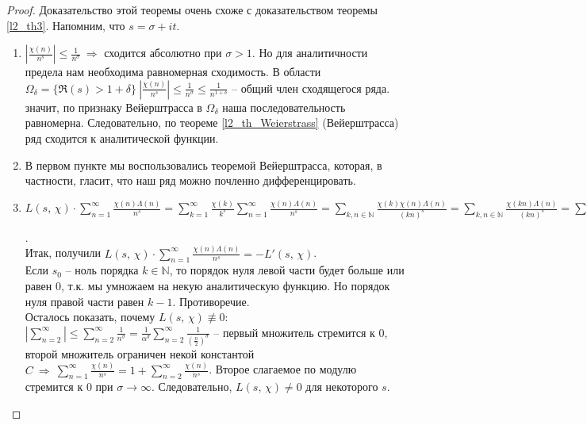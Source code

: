 \begin{proof}
	Доказательство этой теоремы очень схоже с доказательством теоремы \ref{l2_th3}. Напомним, что $s = \sigma + it$.
	\begin{enumerate}
		\item[1)] $\displaystyle \left| \frac{\chi(n)}{n^s} \right| \leq \frac{1}{n^\sigma} \ \Rightarrow$ сходится абсолютно при $\sigma > 1$. Но для аналитичности предела нам необходима равномерная сходимость. В области $\displaystyle \Omega_\delta = \{ \Re(s) > 1+\delta \} \ \left| \frac{\chi(n)}{n^s} \right| \leq \frac{1}{n^\sigma} \leq \frac{1}{n^{1+\delta}}$ -- общий член сходящегося ряда. значит, по признаку Вейерштрасса в $\Omega_\delta$ наша последовательность равномерна. Следовательно, по теореме \ref{l2_th_Weierstrass} (Вейерштрасса) ряд сходится к аналитической функции.
		\item[2)] В первом пункте мы воспользовались теоремой Вейерштрасса, которая, в частности, гласит, что наш ряд можно почленно дифференцировать.
		\item[3)] $\displaystyle L(s,\,\chi)\cdot\sum\limits_{n=1}^\infty \frac{\chi(n)\Lambda(n)}{n^s} = \sum\limits_{k=1}^\infty \frac{\chi(k)}{k^s} \sum\limits_{n=1}^\infty \frac{\chi(n)\Lambda(n)}{n^s} = \sum\limits_{k,n \in \mathbb{N}} \frac{\chi(k)\chi(n)\Lambda(n)}{(kn)^s} = \sum\limits_{k,n \in \mathbb{N}} \frac{\chi(kn)\Lambda(n)}{(kn)^s} = \sum\limits_{\substack{n \in \mathbb{N} \\ d \vert n}} \frac{\chi(n)\Lambda(d)}{n^s} = \sum\limits_{n \in \mathbb{N}} \frac{\chi(n) \ln(n)}{n^s} = -L'(s,\,\chi)$.\\
			Итак, получили $\displaystyle L(s,\,\chi) \cdot \sum\limits_{n=1}^\infty \frac{\chi(n)\Lambda(n)}{n^s} = -L'(s,\,\chi)$.\\
			Если $s_0$ -- ноль порядка $k \in \mathbb{N}$, то порядок нуля левой части будет больше или равен $0$, т.к. мы умножаем на некую аналитическую функцию. Но порядок нуля правой части равен $k-1$. Противоречие.\\
Осталось показать, почему $L(s, \, \chi) \not\equiv 0$: $\displaystyle \left| \sum\limits_{n=2}^\infty \right| \leq \sum\limits_{n=2}^\infty \frac{1}{n^\sigma} = \frac{1}{\alpha^\sigma}\sum\limits_{n=2}^\infty \frac{1}{\left( \frac{n}{2}\right)^\sigma}$ -- первый множитель стремится к $0$, второй множитель ограничен некой константой $\displaystyle C \ \Rightarrow \ \sum\limits_{n=1}^\infty \frac{\chi(n)}{n^s} = 1+\sum\limits_{n=2}^\infty \frac{\chi(n)}{n^s}$. Второе слагаемое по модулю стремится к $0$ при $\sigma \to \infty$. Следовательно, $L(s, \, \chi) \ne 0$ для некоторого $s$.
	\end{enumerate}
\end{proof}